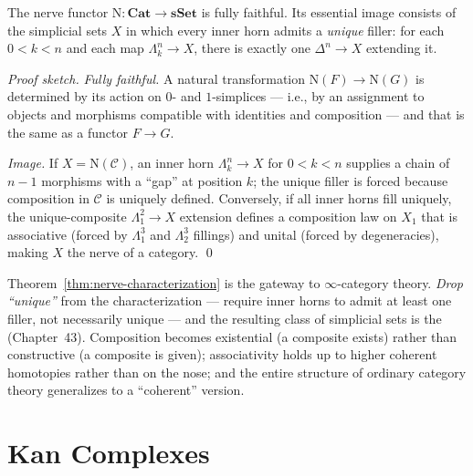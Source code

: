 \begin{theorem}
\label{thm:nerve-characterization}
The nerve functor $\mathrm{N} : \mathbf{Cat} \to \mathbf{sSet}$ is fully
faithful. Its essential image consists of the simplicial sets $X$ in
which every inner horn admits a \emph{unique} filler: for each $0 < k
< n$ and each map $\Lambda^n_k \to X$, there is exactly one $\Delta^n
\to X$ extending it.
\end{theorem}

\begin{proof}[Proof sketch]
\emph{Fully faithful.} A natural transformation $\mathrm{N}(F) \to
\mathrm{N}(G)$ is determined by its action on $0$- and $1$-simplices —
i.e., by an assignment to objects and morphisms compatible with
identities and composition — and that is the same as a functor
$F \to G$.

\emph{Image.} If $X = \mathrm{N}(\mathcal{C})$, an inner horn
$\Lambda^n_k \to X$ for $0 < k < n$ supplies a chain of $n-1$ morphisms
with a ``gap'' at position $k$; the unique filler is forced because
composition in $\mathcal{C}$ is uniquely defined. Conversely, if all
inner horns fill uniquely, the unique-composite $\Lambda^2_1 \to X$
extension defines a composition law on $X_1$ that is associative (forced
by $\Lambda^3_1$ and $\Lambda^3_2$ fillings) and unital (forced by
degeneracies), making $X$ the nerve of a category.
\qed
\end{proof}

\begin{remark}
Theorem~\ref{thm:nerve-characterization} is the gateway to
$\infty$-category theory. \emph{Drop ``unique''} from the
characterization — require inner horns to admit at least one filler, not
necessarily unique — and the resulting class of simplicial sets is the
 (Chapter~43). Composition becomes existential
(a composite exists) rather than constructive (a composite is given);
associativity holds up to higher coherent homotopies rather than on the
nose; and the entire structure of ordinary category theory generalizes
to a ``coherent'' version.
\end{remark}


\section{Kan Complexes}
\label{sec:kan-complexes}

